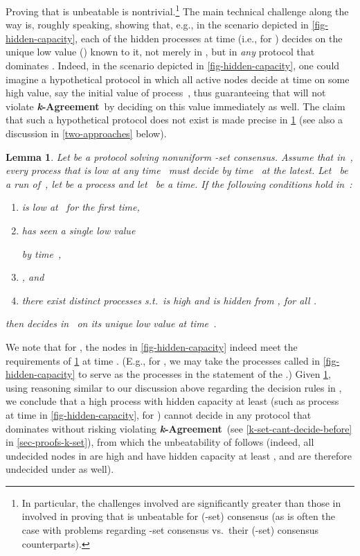 \documentclass[11pt]{article}
\newtheorem{lemma}{Lemma}
\theoremstyle{definition}
\newcommand{\defemph}[1]{\textbf{\textit{#1}}}
\newcommand{\kAgreement}{{\bf \defemph{k}-Agreement}}
\begin{document}
Proving that  is unbeatable
is nontrivial.\footnote{In particular, the challenges involved are significantly greater than those in involved in proving that  is unbeatable for (-set) consensus (as is often the case with problems regarding -set consensus vs.\ their (-set) consensus counterparts).} The main technical challenge along the way is,
roughly speaking, showing that, e.g., in the scenario depicted in \cref{fig-hidden-capacity}, each of the
hidden
processes at time  (i.e.,  for ) decides on the
unique low value () known to it, not merely in , but in \emph{any} protocol  that dominates . Indeed, in the scenario depicted in \cref{fig-hidden-capacity}, one could imagine a hypothetical protocol in which all active nodes decide at time  on some high value, say the initial value of process~, thus guaranteeing that  will not violate \kAgreement\ by deciding on this value immediately as well.
The claim that such a hypothetical protocol does not exist is made precise in \cref{two-face}
(see also a discussion in \cref{two-approaches}
below).

\begin{lemma}
\label{two-face}
Let  be a protocol solving nonuniform -set consensus.
Assume that in~, every process  that is low at any time~
must decide by time~ at the latest.
Let~ be a run of~,
let  be a process and let~ be a time.
If the following conditions hold in~:
\begin{enumerate}
\item\label{two-face-first-time}
 is low at~ for the first time,
\item
 has seen a single low value

by time~,
\item
, and
\item
there exist  distinct processes 
s.t.\ 
is high
and  is hidden from ,
for all .
\end{enumerate}
then  decides in~ on its unique low value  at time~.
\end{lemma}
\noindent
We note that for
, the nodes  in \cref{fig-hidden-capacity} indeed meet the requirements of \cref{two-face} at time . (E.g., for , we may take the processes called  in \cref{fig-hidden-capacity} to serve as the processes  in the statement of the .)
Given \cref{two-face}, using reasoning similar to our discussion above regarding the decision rules in , we conclude that
a high process with hidden capacity at least  (such as process~ at time  in \cref{fig-hidden-capacity}, for ) cannot decide in
any protocol  that dominates 
without risking violating \kAgreement\ (see \cref{k-set-cant-decide-before} in \cref{sec-proofs-k-set}), from which the
unbeatability
of  follows (indeed, all undecided nodes in  are high
and have hidden capacity at least ,
and are therefore undecided under  as well).
\end{document}
